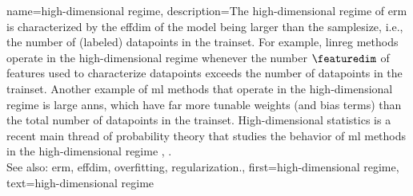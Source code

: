 {name={high-dimensional regime}, 
	description={The 
		high-dimensional regime of \gls{erm} is characterized by the \gls{effdim} of the \gls{model} 
		being larger than the \gls{samplesize}, i.e., the number of (labeled) \glspl{datapoint} in the \gls{trainset}. 
		For example, \gls{linreg} methods operate in the high-dimensional regime whenever the number $\featuredim$ of \glspl{feature} 
		used to characterize \glspl{datapoint} exceeds the number of \glspl{datapoint} in the \gls{trainset}. 
		Another example of \gls{ml} methods that operate in the high-dimensional regime is large \glspl{ann}, which have 
		far more tunable \gls{weights} (and bias terms) than the total number of \glspl{datapoint} in the \gls{trainset}. 
		High-dimensional statistics is a recent main thread of \gls{probability} theory that studies the 
		behavior of \gls{ml} methods in the high-dimensional regime \cite{Wain2019}, \cite{BuhlGeerBook}.
				\\
		See also: \gls{erm}, \gls{effdim}, \gls{overfitting}, \gls{regularization}.},
   	first={high-dimensional regime},
	text={high-dimensional regime} 
}

